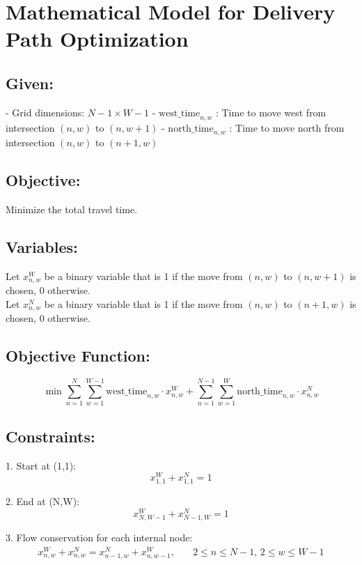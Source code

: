 \documentclass{article}
\begin{document}
\section*{Mathematical Model for Delivery Path Optimization}

\subsection*{Given:}
- Grid dimensions: \(N-1 \times W-1\)
- \( \text{west\_time}_{n,w} \) : Time to move west from intersection \((n,w)\) to \((n,w+1)\)
- \( \text{north\_time}_{n,w} \) : Time to move north from intersection \((n,w)\) to \((n+1,w)\)

\subsection*{Objective:}
Minimize the total travel time.

\subsection*{Variables:}
Let \(x_{n,w}^W\) be a binary variable that is 1 if the move from \((n,w)\) to \((n,w+1)\) is chosen, 0 otherwise. \\
Let \(x_{n,w}^N\) be a binary variable that is 1 if the move from \((n,w)\) to \((n+1,w)\) is chosen, 0 otherwise.

\subsection*{Objective Function:}
\begin{equation}
\min \sum_{n=1}^{N} \sum_{w=1}^{W-1} \text{west\_time}_{n,w} \cdot x_{n,w}^W + \sum_{n=1}^{N-1} \sum_{w=1}^{W} \text{north\_time}_{n,w} \cdot x_{n,w}^N
\end{equation}

\subsection*{Constraints:}
1. Start at (1,1):
   \begin{equation}
   x_{1,1}^W + x_{1,1}^N = 1
   \end{equation}

2. End at (N,W):
   \begin{equation}
   x_{N,W-1}^W + x_{N-1,W}^N = 1
   \end{equation}

3. Flow conservation for each internal node:
   \begin{align}
   x_{n,w}^W + x_{n,w}^N = x_{n-1,w}^N + x_{n,w-1}^W, & \quad 2 \leq n \leq N-1, \, 2 \leq w \leq W-1
   \end{align}
\end{document}
